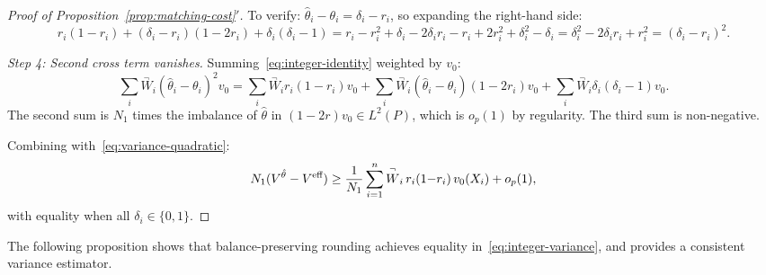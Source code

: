 \documentclass{article}
\newcommand{\paragraph}[1]{\par\noindent\textit{#1}\enspace}
\theoremstyle{definition}
\newcommand{\<}{\langle}
\renewcommand{\>}{\rangle}
\begin{document}
\begin{refsection}
\begin{proof}[Proof of Proposition~\ref{prop:matching-cost}$'$]
To verify: $\hat\theta_i - \theta_i = \delta_i - r_i$, so expanding the right-hand side:
\[
r_i(1{-}r_i) + (\delta_i - r_i)(1{-}2r_i) + \delta_i(\delta_i - 1) = r_i - r_i^2 + \delta_i - 2\delta_i r_i - r_i + 2r_i^2 + \delta_i^2 - \delta_i = \delta_i^2 - 2\delta_i r_i + r_i^2 = (\delta_i - r_i)^2.
\]

\paragraph{Step 4: Second cross term vanishes.}
Summing~\eqref{eq:integer-identity} weighted by $v_0$:
\[
\sum_i \overset{\neg}{W}_i(\hat\theta_i - \theta_i)^2 v_0 = \sum_i \overset{\neg}{W}_i r_i(1{-}r_i) v_0 + \sum_i \overset{\neg}{W}_i(\hat\theta_i - \theta_i)(1{-}2r_i) v_0 + \sum_i \overset{\neg}{W}_i \delta_i(\delta_i - 1) v_0.
\]
The second sum is $N_1$ times the imbalance of $\hat\theta$ in $(1{-}2r)v_0 \in L^2(P)$, which is $o_p(1)$ by regularity. The third sum is non-negative.

Combining with~\eqref{eq:variance-quadratic}:
\[
N_1(V^{\hat\theta} - V^{\textup{eff}}) \ge \frac{1}{N_1}\sum_{i=1}^n \overset{\neg}{W}_i\,r_i(1{-}r_i)\,v_0(X_i) + o_p(1),
\]
with equality when all $\delta_i \in \{0,1\}$. \qedhere
\end{proof}

The following proposition shows that balance-preserving rounding achieves equality in~\eqref{eq:integer-variance}, and provides a consistent variance estimator.


\end{refsection}
\end{document}
